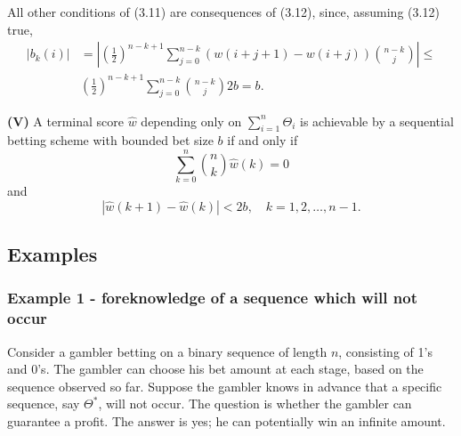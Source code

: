 \documentclass[11pt]{article}
\numberwithin{equation}{section}
\theoremstyle{boldStyle}
\begin{document}
All other conditions of (3.11) are consequences of (3.12), since, assuming (3.12) true,
\begin{equation} \label{eq:3.13}
    \begin{aligned}
        \left|b_k(i)\right| &= \left| \left(\frac{1}{2}\right)^{n-k+1} \sum_{j=0}^{n-k} \left(w(i + j + 1) - w(i + j)\right) \binom{n-k}{j} \right| \leq \\
        &\left(\frac{1}{2}\right)^{n-k+1} \sum_{j=0}^{n-k} \binom{n-k}{j} 2b = b.
    \end{aligned}
\end{equation}

\begin{boxA}
\textbf{(V)} A terminal score \(\hat{w}\) depending only on \(\sum_{i=1}^n \Theta_i\) is achievable by a sequential betting scheme with bounded bet size \(b\) if and only if
\begin{equation} \label{eq:3.14}
    \sum_{k=0}^n \binom{n}{k} \hat{w}(k) = 0
\end{equation}
and
\begin{equation} \label{eq:3.15}
    \left| \hat{w}(k + 1) - \hat{w}(k)\right| < 2b, \quad k = 1, 2, \ldots, n - 1.
\end{equation}
\end{boxA}



\subsection{Examples}

\subsubsection{Example 1 - foreknowledge of a sequence which will not occur}

Consider a gambler betting on a binary sequence of length \(n\), consisting of 1's and 0's. 
The gambler can choose his bet amount at each stage, based on the sequence observed so far. 
Suppose the gambler knows in advance that a specific sequence, say \(\Theta^*\), will not occur. 
The question is whether the gambler can guarantee a profit. The answer is yes; he can potentially win an infinite amount. 
\end{document}
